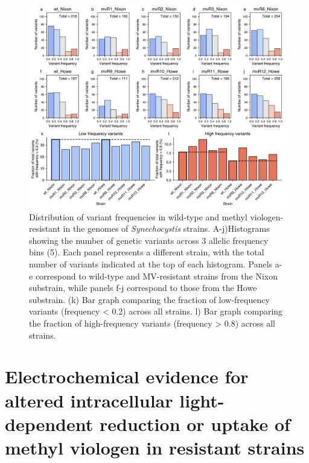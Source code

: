\documentclass[12pt]{article}
\begin{document}
\begin{figure}[H]
    \centering
    \includegraphics[width=\hsize]{../Figures/WGS/variant_frequency_fraction_comparison_5bins.png}
    \caption{Distribution of variant frequencies in wild-type and methyl viologen-resistant in the genomes of \textit{Synechocystis} strains. A-j)Histograms showing the number of genetic variants across 3 allelic frequency bins (5). Each panel represents a different strain, with the total number of variants indicated at the top of each histogram. Panels a-e correspond to wild-type and MV-resistant strains from the Nixon substrain, while panels f-j correspond to those from the Howe substrain. (k) Bar graph comparing the fraction of low-frequency variants (frequency < 0.2) across all strains. l) Bar graph comparing the fraction of high-frequency variants (frequency > 0.8) across all strains.}
    \label{fig:5bins}
\end{figure}





\section{Electrochemical evidence for altered intracellular light-dependent reduction or uptake of methyl viologen in resistant strains}
\end{document}
